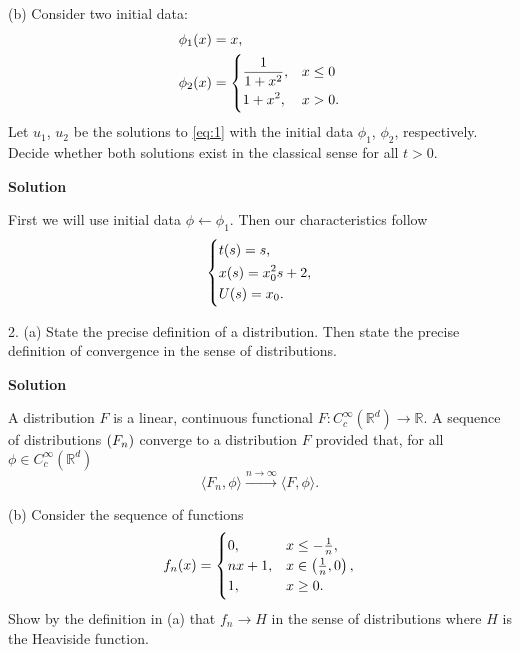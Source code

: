 \documentclass{article}
\begin{document}
\vspace{5mm}

(b) Consider two initial data:
%
\begin{align*}
    \phi_1(x) &= x, \\
    \phi_2(x) &=
        \begin{dcases}
            \frac{1}{1 + x^2}, & x \leq 0 \\
            1 + x^2, & x > 0.
        \end{dcases}
\end{align*}
%
Let $u_1$, $u_2$ be the solutions to \eqref{eq:1} with the initial data
$\phi_1$, $\phi_2$, respectively. Decide whether both solutions exist in
the classical sense for all $t > 0$.

\textbf{Solution}

First we will use initial data $\phi \gets \phi_1$. Then our
characteristics follow
%
\begin{equation*}
    \begin{dcases}
        t(s) = s, \\
        x(s) = x_0^2 s + 2, \\
        U(s) = x_0
        .
    \end{dcases}
\end{equation*}

\newpage

2. (a) State the precise definition of a distribution. Then state the
precise definition of convergence in the sense of distributions.

\textbf{Solution}

A distribution $F$ is a linear, continuous functional $F:
C_c^\infty(\mathbb{R}^d) \to \mathbb{R}$. A sequence of distributions
$\del{F_n}$ converge to a distribution $F$ provided that, for all $\phi
\in C_c^\infty(\mathbb{R}^d)$
%
\begin{equation*}
    \langle F_n, \phi \rangle \xrightarrow{n \to \infty} \langle F, \phi \rangle
    .
\end{equation*}

\vspace{5mm}

(b) Consider the sequence of functions
%
\begin{equation*}
    f_n(x) =
        \begin{cases}
            0, & x \leq -\frac{1}{n}, \\
            n x + 1, & x \in \del{\frac{1}{n}, 0}, \\
            1, & x \geq 0.
        \end{cases}
\end{equation*}
%
Show by the definition in (a) that $f_n \to H$ in the sense of
distributions where $H$ is the Heaviside function.
\end{document}
